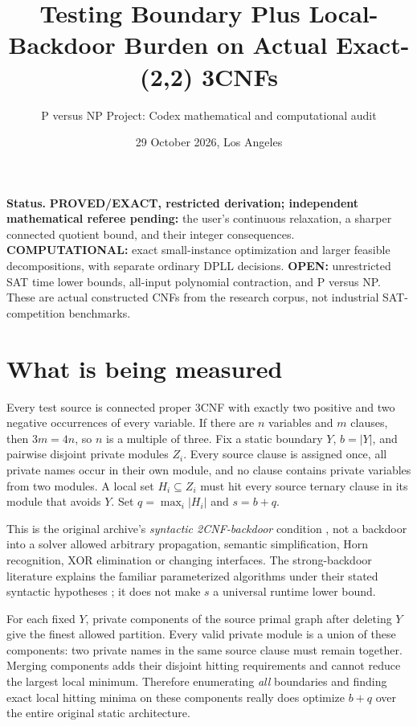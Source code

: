 \documentclass[11pt]{article}
\title{Testing Boundary Plus Local-Backdoor Burden on Actual Exact-(2,2) 3CNFs}
\author{P versus NP Project: Codex mathematical and computational audit}
\date{29 October 2026, Los Angeles}
\begin{document}
\maketitle
\noindent\textbf{Status.} \textbf{PROVED/EXACT, restricted derivation; independent mathematical referee pending:} the user's continuous relaxation, a sharper connected quotient bound, and their integer consequences. \textbf{COMPUTATIONAL:} exact small-instance optimization and larger feasible decompositions, with separate ordinary DPLL decisions. \textbf{OPEN:} unrestricted SAT time lower bounds, all-input polynomial contraction, and P versus NP. These are actual constructed CNFs from the research corpus, not industrial SAT-competition benchmarks.

\section{What is being measured}
Every test source is connected proper 3CNF with exactly two positive and two negative occurrences of every variable. If there are $n$ variables and $m$ clauses, then $3m=4n$, so $n$ is a multiple of three. Fix a static boundary $Y$, $b=|Y|$, and pairwise disjoint private modules $Z_i$. Every source clause is assigned once, all private names occur in their own module, and no clause contains private variables from two modules. A local set $H_i\subseteq Z_i$ must hit every source ternary clause in its module that avoids $Y$. Set $q=\max_i|H_i|$ and $s=b+q$.

This is the original archive's \emph{syntactic 2CNF-backdoor} condition \cite{archive}, not a backdoor into a solver allowed arbitrary propagation, semantic simplification, Horn recognition, XOR elimination or changing interfaces. The strong-backdoor literature explains the familiar parameterized algorithms under their stated syntactic hypotheses \cite{nrs2004}; it does not make $s$ a universal runtime lower bound.

For each fixed $Y$, private components of the source primal graph after deleting $Y$ give the finest allowed partition. Every valid private module is a union of these components: two private names in the same source clause must remain together. Merging components adds their disjoint hitting requirements and cannot reduce the largest local minimum. Therefore enumerating \emph{all} boundaries and finding exact local hitting minima on these components really does optimize $b+q$ over the entire original static architecture.
\end{document}

